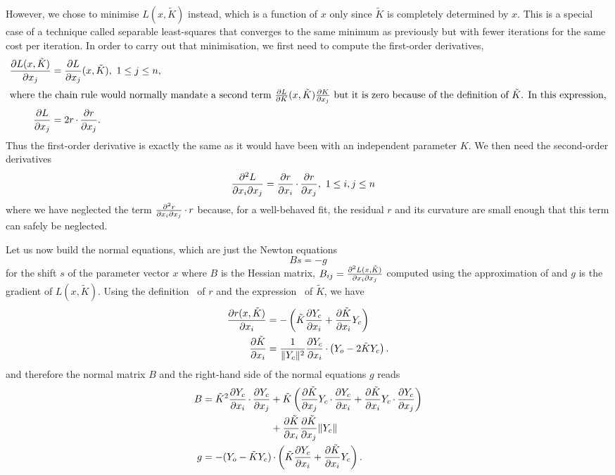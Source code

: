\documentclass[pdf]{iucr}
\begin{document}
However, we chose to minimise $L(x, \tilde{K})$ instead, which is a function of $x$ only since $\tilde{K}$ is completely determined by $x$. This is a special case of a technique called separable least-squares \cite[, and references therein]{Nielsen:2000fr} that  converges to the same minimum as previously but with fewer iterations for the same cost per iteration. In order to carry out that minimisation, we first need to compute the first-order derivatives,
\begin{align}
\frac{\partial L(x, \tilde{K})}{\partial x_j} &= \frac{\partial L}{\partial x_j}(x, \tilde{K}),\ 1 \le j \le n, \\
\intertext{where the chain rule would normally mandate a second term $\frac{\partial L}{\partial K}(x, \tilde{K})\frac{\partial K}{\partial x_j}$ but it is zero because of the definition of $\tilde{K}$. In this expression,}
\frac{\partial L}{\partial x_j} &= 2 r \operatorname{\cdot} \frac{\partial r}{\partial x_j}.
\end{align}
Thus the first-order derivative is exactly the same as it would have been with an independent parameter $K$. We then need the second-order derivatives
\begin{align}
\frac{\partial^2 L}{\partial x_i \partial x_j} &= \frac{\partial r}{\partial x_i} \operatorname{\cdot} \frac{\partial r}{\partial x_j},\ 1 \le i,j \le n
\label{eqn:gaussleastsquares}
\end{align}
where we have neglected the term $\frac{\partial^2 r}{\partial x_i \partial x_j} \operatorname{\cdot} r$ because, for a well-behaved fit, the residual $r$ and its curvature are small enough that this term can safely be neglected.

Let us now build the normal equations, which are just the Newton equations 
\begin{equation}
Bs = -g
\end{equation}
for the shift $s$ of the parameter vector $x$ where $B$ is the Hessian matrix, $B_{ij} = \frac{\partial^2 L(x, \tilde{K})}{\partial x_i \partial x_j}$ computed using the approximation of  and $g$ is the gradient of $L(x, \tilde{K})$. Using the definition~ of $r$ and the expression~ of $\tilde{K}$, we have
\begin{align}
\frac{\partial r(x, \tilde{K})}{\partial x_i} &= -\left( \tilde{K}\frac{\partial Y_c}{\partial x_i} + \frac{\partial \tilde{K}}{\partial x_i} Y_c \right) \\
\frac{\partial \tilde{K}}{\partial x_i} &= \frac{1}{\| Y_c \|^2}\frac{\partial Y_c}{\partial x_i} \operatorname{\cdot} \left(Y_o - 2 \tilde{K}Y_c \right).
\end{align}
and therefore the normal matrix $B$ and the right-hand side of the normal equations $g$ reads
\begin{align}
B &= \begin{aligned}[t] \tilde{K}^2\frac{\partial Y_c}{\partial x_i} \operatorname{\cdot} \frac{\partial Y_c}{\partial x_j} 
&+ \tilde{K} \left( \frac{\partial \tilde{K}}{\partial x_j}Y_c \operatorname{\cdot} \frac{\partial Y_c}{\partial x_i}
+ \frac{\partial \tilde{K}}{\partial x_i}Y_c \operatorname{\cdot} \frac{\partial Y_c}{\partial x_j} \right) \nonumber\\
&+ \frac{\partial \tilde{K}}{\partial x_i}\frac{\partial \tilde{K}}{\partial x_j} \| Y_c \|
\end{aligned}
\\
g &= - (Y_o - \tilde{K}Y_c) \operatorname{\cdot} \left( \tilde{K}\frac{\partial Y_c}{\partial x_i} + \frac{\partial \tilde{K}}{\partial x_i} Y_c \right).
\end{align}
\end{document}
